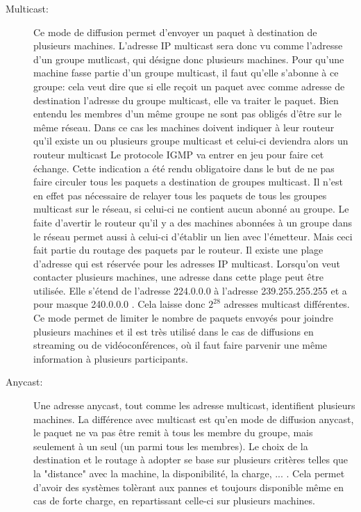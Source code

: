\begin{description}
\item[Multicast:] Ce mode de diffusion permet d'envoyer un paquet à destination
de plusieurs machines. L'adresse IP multicast sera donc vu comme l'adresse d'un
groupe mutlicast, qui désigne donc plusieurs machines. Pour qu'une machine
fasse partie d'un groupe multicast, il faut qu'elle s'abonne à ce groupe: cela
veut dire que si elle reçoit un paquet avec comme adresse de destination
l'adresse du groupe multicast, elle va traiter le paquet.  Bien entendu les
membres d'un même groupe ne sont pas obligés d'être sur le même réseau. Dans ce
cas les machines doivent indiquer à leur routeur qu'il existe un ou plusieurs
groupe multicast et celui-ci deviendra alors un routeur multicast Le protocole
IGMP va entrer en jeu pour faire cet échange.  Cette indication a été rendu
obligatoire dans le but de ne pas faire circuler tous les paquets a destination
de groupes multicast.  Il n'est en effet pas nécessaire de relayer tous les
paquets de tous les groupes multicast sur le réseau, si celui-ci ne contient
aucun abonné au groupe.  Le faite d'avertir le routeur qu'il y a des machines
abonnées à un groupe dans le réseau permet aussi à celui-ci d'établir un lien
avec l'émetteur. Mais ceci fait partie du routage des paquets par le routeur.
Il existe une plage d'adresse qui est réservée pour les adresses IP multicast.
Lorsqu'on veut contacter plusieurs machines, une adresse dans cette plage peut
être utilisée.  Elle s'étend de l'adresse 224.0.0.0 à l'adresse 239.255.255.255
et a pour masque 240.0.0.0 . Cela laisse donc $2^{28}$ adresses multicast
différentes.
Ce mode permet de limiter le nombre de paquets envoyés pour joindre plusieurs
machines et il est très utilisé dans le cas de diffusions en streaming ou de
vidéoconférences, où il faut faire parvenir une même information à plusieurs
participants.

\item[Anycast:] Une adresse anycast, tout comme les adresse multicast,
identifient plusieurs machines. La différence avec multicast est qu'en mode de
diffusion anycast, le paquet ne va pas être remit à tous les membre du groupe,
mais seulement à un seul (un parmi tous les membres).  Le choix de la
destination et le routage à adopter se base sur plusieurs critères telles que
la "distance" avec la machine, la disponibilité, la charge, ... . Cela permet
d'avoir des systèmes tolèrant aux pannes et toujours disponible même en cas de forte charge, en
repartissant celle-ci sur plusieurs machines.

\end{description}



